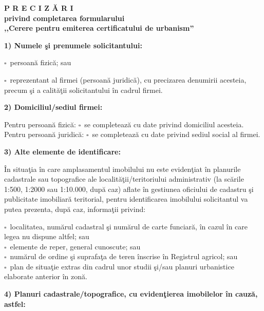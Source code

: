 \documentclass[10pt,a4paper]{article}
\newcommand{\checkboxempty}{$\square$}
\begin{document}
\begin{center}
\textbf{P R E C I Z Ă R I}\\
\textbf{privind completarea formularului}\\
\textbf{,,Cerere pentru emiterea certificatului de urbanism''}
\end{center}

\vspace{0.25cm}

\textbf{1) Numele şi prenumele solicitantului:}

\checkboxempty\ persoană fizică; sau

\checkboxempty\ reprezentant al firmei (persoană juridică), cu precizarea denumirii acesteia, precum şi a calităţii solicitantului în cadrul firmei.

\vspace{0.3cm}

\textbf{2) Domiciliul/sediul firmei:}

Pentru persoană fizică: \checkboxempty\ se completează cu date privind domiciliul acesteia.\\
Pentru persoană juridică: \checkboxempty\ se completează cu date privind sediul social al firmei.

\vspace{0.3cm}

\textbf{3) Alte elemente de identificare:}

În situaţia în care amplasamentul imobilului nu este evidenţiat în planurile cadastrale sau topografice ale localităţii/teritoriului administrativ (la scările 1:500, 1:2000 sau 1:10.000, după caz) aflate în gestiunea oficiului de cadastru şi publicitate imobiliară teritorial, pentru identificarea imobilului solicitantul va putea prezenta, după caz, informaţii privind:

\checkboxempty\ localitatea, numărul cadastral şi numărul de carte funciară, în cazul în care legea nu dispune altfel; sau\\
\checkboxempty\ elemente de reper, general cunoscute; sau\\
\checkboxempty\ numărul de ordine şi suprafaţa de teren înscrise în Registrul agricol; sau\\
\checkboxempty\ plan de situaţie extras din cadrul unor studii şi/sau planuri urbanistice elaborate anterior în zonă.

\vspace{0.3cm}

\textbf{4) Planuri cadastrale/topografice, cu evidenţierea imobilelor în cauză, astfel:}
\end{document}
